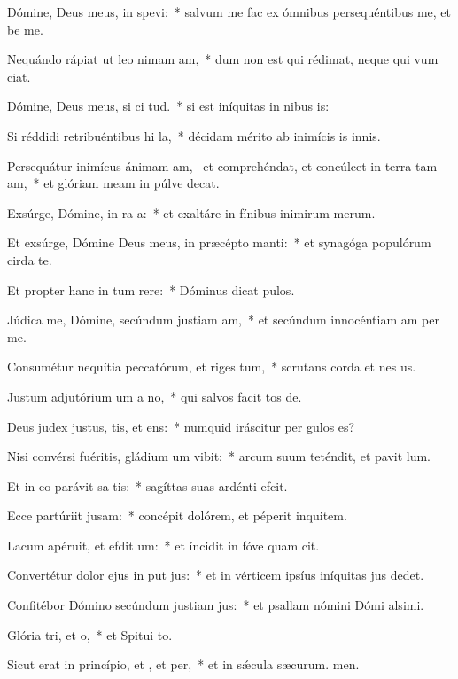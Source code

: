 \item Dómine, Deus meus, in  spevi:~* salvum me fac ex ómnibus persequéntibus me, et be me.
\item Nequándo rápiat ut leo nimam am,~* dum non est qui rédimat, neque qui vum ciat.
\item Dómine, Deus meus, si ci tud.~* si est iníquitas in nibus is:
\item Si réddidi retribuéntibus hi la,~* décidam mérito ab inimícis is innis.
\item Persequátur inimícus ánimam am,~\pscross{} et comprehéndat, et concúlcet in terra tam am,~* et glóriam meam in púlve decat.
\item Exsúrge, Dómine, in ra a:~* et exaltáre in fínibus inimirum merum.
\item Et exsúrge, Dómine Deus meus, in præcépto  manti:~* et synagóga populórum cirda te.
\item Et propter hanc in tum rere:~* Dóminus dicat pulos.
\item Júdica me, Dómine, secúndum justiam am,~* et secúndum innocéntiam am per me.
\item Consumétur nequítia peccatórum, et riges tum,~* scrutans corda et nes us.
\item Justum adjutórium um a no,~* qui salvos facit tos de.
\item Deus judex justus, tis, et ens:~* numquid iráscitur per gulos es?
\item Nisi convérsi fuéritis, gládium um vibit:~* arcum suum teténdit, et pavit lum.
\item Et in eo parávit sa tis:~* sagíttas suas ardénti efcit.
\item Ecce partúriit jusam:~* concépit dolórem, et péperit inquitem.
\item Lacum apéruit, et efdit um:~* et íncidit in fóve quam cit.
\item Convertétur dolor ejus in put jus:~* et in vérticem ipsíus iníquitas jus dedet.
\item Confitébor Dómino secúndum justiam jus:~* et psallam nómini Dómi alsimi.
\item Glória tri, et o,~* et Spitui to.
\item Sicut erat in princípio, et , et per,~* et in sǽcula sæcurum. men.
